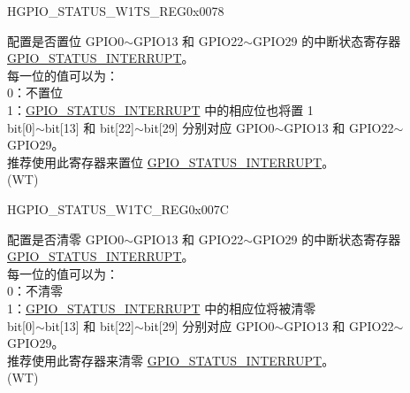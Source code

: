 \begin{register}{H}{GPIO\_STATUS\_W1TS\_REG}{0x0078}\label{regdesc:GPIOSTATUSW1TSREG}
%
\regnewline%
\begin{regdesc}\begin{reglist}
\label{fielddesc:GPIOSTATUSW1TS}\item [GPIO\_STATUS\_W1TS] 配置是否置位 GPIO0$\sim$GPIO13 和 GPIO22$\sim$GPIO29 的中断状态寄存器 \hyperref[fielddesc:GPIOSTATUSINTERRUPT]{GPIO\_STATUS\_INTERRUPT}。\\
每一位的值可以为：\\
0：不置位\\
1：\hyperref[fielddesc:GPIOSTATUSINTERRUPT]{GPIO\_STATUS\_INTERRUPT} 中的相应位也将置 1\\
bit[0]$\sim$bit[13] 和 bit[22]$\sim$bit[29] 分别对应 GPIO0$\sim$GPIO13 和 GPIO22$\sim$GPIO29。\\
推荐使用此寄存器来置位 \hyperref[fielddesc:GPIOSTATUSINTERRUPT]{GPIO\_STATUS\_INTERRUPT}。\\
 (WT)
\end{reglist}\end{regdesc}
\end{register}


\begin{register}{H}{GPIO\_STATUS\_W1TC\_REG}{0x007C}\label{regdesc:GPIOSTATUSW1TCREG}
%
\regnewline%
\begin{regdesc}\begin{reglist}
\label{fielddesc:GPIOSTATUSW1TC}\item [GPIO\_STATUS\_W1TC] 配置是否清零 GPIO0$\sim$GPIO13 和 GPIO22$\sim$GPIO29 的中断状态寄存器 \hyperref[fielddesc:GPIOSTATUSINTERRUPT]{GPIO\_STATUS\_INTERRUPT}。\\
每一位的值可以为：\\
0：不清零\\
1：\hyperref[fielddesc:GPIOSTATUSINTERRUPT]{GPIO\_STATUS\_INTERRUPT} 中的相应位将被清零\\
bit[0]$\sim$bit[13] 和 bit[22]$\sim$bit[29] 分别对应 GPIO0$\sim$GPIO13 和 GPIO22$\sim$GPIO29。\\
推荐使用此寄存器来清零 \hyperref[fielddesc:GPIOSTATUSINTERRUPT]{GPIO\_STATUS\_INTERRUPT}。\\
(WT)
\end{reglist}\end{regdesc}
\end{register}


